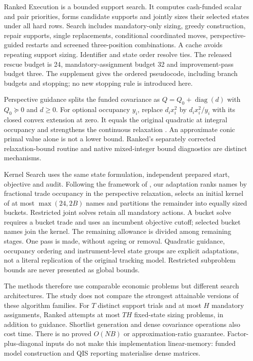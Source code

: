 \documentclass[preprint,12pt,authoryear]{elsarticle}
\begin{document}
Ranked Execution is a bounded support search. It computes cash-funded scalar
and pair priorities, forms candidate supports and jointly sizes their selected
states under all hard rows. Search includes mandatory-only sizing, greedy
construction, repair supports, single replacements, conditional coordinated
moves, perspective-guided restarts and screened three-position combinations.
A cache avoids repeating support sizing. Identifier and state order resolve
ties. The released rescue budget is 24, mandatory-assignment budget 32 and
improvement-pass budget three. The supplement gives the ordered pseudocode,
including branch budgets and stopping; no new stopping rule is introduced here.

Perspective guidance splits the funded covariance as
$Q=Q_0+\operatorname{diag}(d)$ with $Q_0\succeq0$ and $d\ge0$.
For optional occupancy $y_i$, replace $d_ix_i^2$ by $d_ix_i^2/y_i$ with its
closed convex extension at zero. It equals the original quadratic at integral
occupancy and strengthens the continuous relaxation
\citep{frangioni2006,gunluk2010}. An approximate conic primal value alone is not
a lower bound. Ranked's separately corrected relaxation-bound routine and
native mixed-integer bound diagnostics are distinct mechanisms.

Kernel Search uses the same state formulation, independent prepared start,
objective and audit. Following the framework of \citet{kernel2012,kernel2014},
our adaptation ranks names by fractional trade occupancy in the perspective
relaxation, selects an initial kernel of at most $\max(24,2B)$ names and partitions
the remainder into equally sized buckets. Restricted joint solves retain all
mandatory actions. A bucket solve requires a bucket trade and uses an incumbent
objective cutoff; selected bucket names join the kernel. The remaining allowance
is divided among remaining stages. One pass is made, without ageing or removal.
Quadratic guidance, occupancy ordering and instrument-level state groups are
explicit adaptations, not a literal replication of the original tracking model.
Restricted subproblem bounds are never presented as global bounds.

The methods therefore use comparable economic problems but different search
architectures. The study does not compare the strongest attainable versions of
these algorithm families. For $T$ distinct support trials and at most $H$
mandatory assignments, Ranked attempts at most $TH$ fixed-state sizing problems,
in addition to guidance. Shortlist generation and dense covariance operations
also cost time. There is no proved $O(NB)$ or approximation-ratio guarantee.
Factor-plus-diagonal inputs do not make this implementation linear-memory:
funded model construction and QIS reporting materialise dense matrices.
\end{document}
